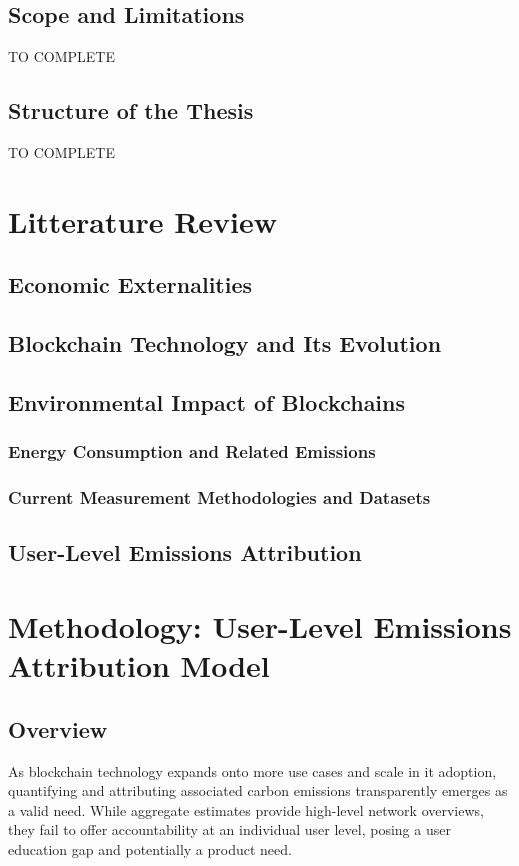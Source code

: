 \documentclass[11pt]{report}
\begin{document}
\section{Scope and Limitations}
TO COMPLETE


\section{Structure of the Thesis}
TO COMPLETE

\chapter{Litterature Review}
\section{Economic Externalities}
\section{Blockchain Technology and Its Evolution}

\section{Environmental Impact of Blockchains}
\subsection{Energy Consumption and Related Emissions}
\subsection{Current Measurement Methodologies and Datasets}
\section{User-Level Emissions Attribution}


\chapter{Methodology: User-Level Emissions Attribution Model}
\section{Overview}


As blockchain technology expands onto more use cases and scale in it adoption, quantifying and attributing associated carbon emissions transparently emerges as a valid need. While aggregate estimates provide high-level network overviews, they fail to offer accountability at an individual user level, posing a user education gap and potentially a product need.
\end{document}
